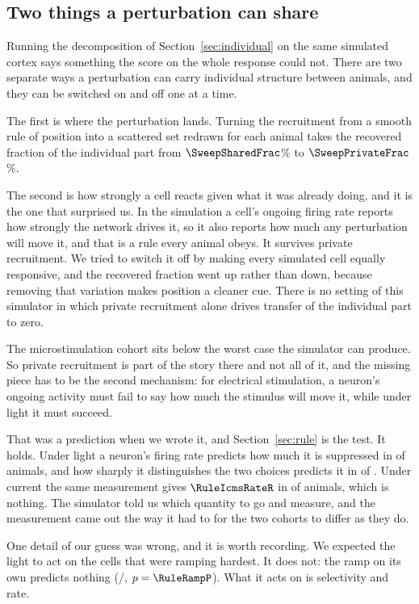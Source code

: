 \documentclass[11pt,letterpaper]{article}
\begin{document}
\subsection{Two things a perturbation can share}

Running the decomposition of Section~\ref{sec:individual} on the same simulated cortex
says something the score on the whole response could not. There are two separate ways a
perturbation can carry individual structure between animals, and they can be switched
on and off one at a time.

The first is where the perturbation lands. Turning the recruitment from a smooth rule
of position into a scattered set redrawn for each animal takes the recovered fraction
of the individual part from $\SweepSharedFrac$\% to $\SweepPrivateFrac$\%.

The second is how strongly a cell reacts given what it was already doing, and it is the
one that surprised us. In the simulation a cell's ongoing firing rate reports how
strongly the network drives it, so it also reports how much any perturbation will move
it, and that is a rule every animal obeys. It survives private recruitment. We tried to
switch it off by making every simulated cell equally responsive, and the recovered
fraction went up rather than down, because removing that variation makes position a
cleaner cue. There is no setting of this simulator in which private recruitment alone
drives transfer of the individual part to zero.

The microstimulation cohort sits below the worst case the simulator can produce. So
private recruitment is part of the story there and not all of it, and the missing piece
has to be the second mechanism: for electrical stimulation, a neuron's ongoing activity
must fail to say how much the stimulus will move it, while under light it must succeed.

That was a prediction when we wrote it, and Section~\ref{sec:rule} is the test. It
holds. Under light a neuron's firing rate predicts how much it is suppressed in
\RuleRateNeg{} of \RuleRateN{} animals, and how sharply it distinguishes the two
choices predicts it in \RuleSelNeg{} of \RuleSelN. Under current the same measurement
gives $\RuleIcmsRateR$ in \RuleIcmsRateNeg{} of \RuleIcmsRateN{} animals, which is
nothing. The simulator told us which quantity to go and measure, and the measurement
came out the way it had to for the two cohorts to differ as they do.

One detail of our guess was wrong, and it is worth recording. We expected the light to
act on the cells that were ramping hardest. It does not: the ramp on its own predicts
nothing (\RuleRampNeg{}/\RuleRampN, $p = \RuleRampP$). What it acts on is selectivity
and rate.
\end{document}
